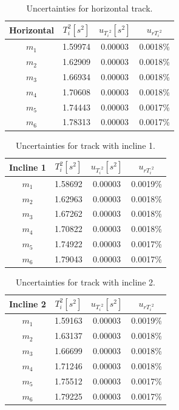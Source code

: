 \documentclass[a4paper,12pt]{article}
\begin{document}
\begin{table}[h]
\begin{center}
\begin{tabular}{|c|c|c|c|}
\hline
Horizontal & $T_i^2 [s^2] $ & $u_{{T_i}^2} [s^2] $ & $ u_{r{T_i}^2} $\\
\hline
$m_1$ & 1.59974 & 0.00003 & 0.0018\%  \\
$m_2$ & 1.62909 & 0.00003 & 0.0018\%  \\
$m_3$ & 1.66934 & 0.00003 & 0.0018\%  \\
$m_4$ & 1.70608 & 0.00003 & 0.0018\%  \\
$m_5$ & 1.74443 & 0.00003 & 0.0017\%  \\
$m_6$ & 1.78313 & 0.00003 & 0.0017\%  \\
\hline
\end{tabular}
\end{center}
\caption{Uncertainties for horizontal track.}
\end{table}

\begin{table}[h]
\begin{center}
\begin{tabular}{|c|c|c|c|}
\hline
Incline 1 & $T_i^2 [s^2] $ & $u_{{T_i}^2} [s^2] $ & $ u_{r{T_i}^2} $\\
\hline
$m_1$ & 1.58692 & 0.00003 & 0.0019\%  \\
$m_2$ & 1.62963 & 0.00003 & 0.0018\%  \\
$m_3$ & 1.67262 & 0.00003 & 0.0018\%  \\
$m_4$ & 1.70822 & 0.00003 & 0.0018\%  \\
$m_5$ & 1.74922 & 0.00003 & 0.0017\%  \\
$m_6$ & 1.79043 & 0.00003 & 0.0017\%  \\
\hline
\end{tabular}
\end{center}
\caption{Uncertainties for track with incline 1.}
\end{table}

\begin{table}[p]
\begin{center}
\begin{tabular}{|c|c|c|c|}
\hline
Incline 2 & $T_i^2 [s^2] $ & $u_{{T_i}^2} [s^2] $ & $ u_{r{T_i}^2} $\\
\hline
$m_1$ & 1.59163 & 0.00003 & 0.0019\%  \\
$m_2$ & 1.63137 & 0.00003 & 0.0018\%  \\
$m_3$ & 1.66699 & 0.00003 & 0.0018\%  \\
$m_4$ & 1.71246 & 0.00003 & 0.0018\%  \\
$m_5$ & 1.75512 & 0.00003 & 0.0017\%  \\
$m_6$ & 1.79225 & 0.00003 & 0.0017\%  \\
\hline
\end{tabular}
\end{center}
\caption{Uncertainties for track with incline 2.}
\end{table}
\end{document}
